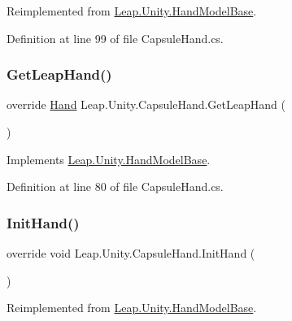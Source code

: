 Reimplemented from \mbox{\hyperlink{class_leap_1_1_unity_1_1_hand_model_base_a3b60b707011fa39db35ca3c902167ade}{Leap.\+Unity.\+Hand\+Model\+Base}}.



Definition at line 99 of file Capsule\+Hand.\+cs.

\mbox{\label{class_leap_1_1_unity_1_1_capsule_hand_a6e1d6a507332ba5577a1e2b17332039b}} 
\subsubsection{\texorpdfstring{GetLeapHand()}{GetLeapHand()}}
{\footnotesize\ttfamily override \mbox{\hyperlink{class_leap_1_1_hand}{Hand}} Leap.\+Unity.\+Capsule\+Hand.\+Get\+Leap\+Hand (\begin{DoxyParamCaption}{ }\end{DoxyParamCaption})\hspace{0.3cm}{\ttfamily [virtual]}}



Implements \mbox{\hyperlink{class_leap_1_1_unity_1_1_hand_model_base_aa24ca02bf4a64ba33b0370ad6da8731f}{Leap.\+Unity.\+Hand\+Model\+Base}}.



Definition at line 80 of file Capsule\+Hand.\+cs.

\mbox{\label{class_leap_1_1_unity_1_1_capsule_hand_a1dc96b8ca5deda73cac12d70b46bc9c5}} 
\subsubsection{\texorpdfstring{InitHand()}{InitHand()}}
{\footnotesize\ttfamily override void Leap.\+Unity.\+Capsule\+Hand.\+Init\+Hand (\begin{DoxyParamCaption}{ }\end{DoxyParamCaption})\hspace{0.3cm}{\ttfamily [virtual]}}



Reimplemented from \mbox{\hyperlink{class_leap_1_1_unity_1_1_hand_model_base_a4789222f2b16957437c703f15afc1bbf}{Leap.\+Unity.\+Hand\+Model\+Base}}.



